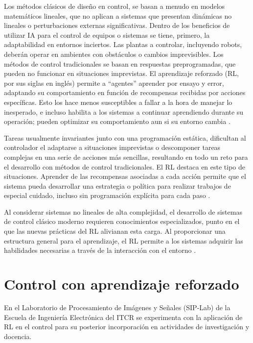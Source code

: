 Los métodos clásicos de diseño en control, se basan a menudo en modelos matemáticos lineales, que no aplican a sistemas que presentan dinámicas no lineales o perturbaciones externas significativas. Dentro de los beneficios de utilizar IA para el control de equipos o sistemas se tiene, primero, la adaptabilidad en entornos inciertos. Las plantas a controlar, incluyendo robots, deberán operar en ambientes con obstáculos o cambios imprevisibles. Los métodos de control tradicionales se basan en respuestas preprogramadas, que pueden no funcionar en situaciones imprevistas. El aprendizaje reforzado (RL, por sus siglas en inglés) permite a ``agentes'' aprender por ensayo y error, adaptando su comportamiento en función de recompensas recibidas por acciones específicas. Esto los hace menos susceptibles a fallar a la hora de manejar lo inesperado, e incluso habilita a los sistemas a continuar aprendiendo durante su operación; pueden optimizar su comportamiento aun si su entorno cambia \cite{Cable-Driven} \cite{SoftComputing}.

Tareas usualmente invariantes junto con una programación estática, dificultan al controlador el adaptarse a situaciones imprevistas o descomponer tareas complejas en una serie de acciones más sencillas, resultando en todo un reto para el desarrollo con métodos de control tradicionales. El RL destaca en este tipo de situaciones. Aprender de las recompensas asociadas a cada acción permite que el sistema pueda desarrollar una estrategia o política para realizar trabajos de especial cuidado, incluso sin programación explícita para cada paso \cite{Cable-Driven}.

Al considerar sistemas no lineales de alta complejidad, el desarrollo de sistemas de control clásico moderno requieren conocimientos especializados, punto en el que las nuevas prácticas del RL alivianan esta carga. Al proporcionar una estructura general para el aprendizaje, el RL permite a los sistemas adquirir las habilidades necesarias a través de la interacción con el entorno \cite{SoftComputing}.


\section{Control con aprendizaje reforzado}

En el Laboratorio de Procesamiento de Imágenes y Señales (SIP-Lab) de la Escuela de Ingeniería Electrónica del ITCR se experimenta con la aplicación de RL en el control para su posterior incorporación en actividades de investigación y docencia.

